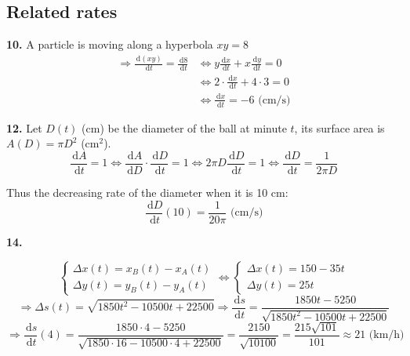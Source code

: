 \documentclass[a4paper,12pt]{article}
\newcommand{\ud}{\,\mathrm{d}}
\begin{document}
\subsection{Related rates}
\textbf{10. }A particle is moving along a hyperbola $xy = 8$
\begin{align*}
  \Longrightarrow \frac{\ud (xy)}{\ud t} = \frac{\ud 8}{\ud t}
  &\iff y\frac{\ud x}{\ud t} + x\frac{\ud y}{\ud t} = 0\\
  &\iff 2 \cdot \frac{\ud x}{\ud t} + 4 \cdot 3 = 0\\
  &\iff \frac{\ud x}{\ud t} = -6\text{ (cm/s)}
\end{align*}

\noindent\textbf{12. }Let $D(t)$ (cm) be the diameter of the ball at minute
$t$, its surface area is $A(D) = \pi D^2$ (cm$^2$).
\[\frac{\ud A}{\ud t} = 1 \iff \frac{\ud A}{\ud D} \cdot \frac{\ud D}{\ud t} = 1
  \iff 2\pi D \frac{\ud D}{\ud t} = 1 \iff \frac{\ud D}{\ud t}
                                  = \frac{1}{2\pi D}\]

Thus the decreasing rate of the diameter when it is 10 cm:
\[\frac{\ud D}{\ud t}(10) = \frac{1}{20\pi}\text{ (cm/s)}\]

\noindent\textbf{14. }

\[\begin{cases}
    \Delta x(t) = x_B(t) - x_A(t)\\
    \Delta y(t) = y_B(t) - y_A(t)
  \end{cases}
\iff\begin{cases}
      \Delta x(t) = 150 - 35t\\
      \Delta y(t) = 25t
  \end{cases}\]
\[\Longrightarrow\Delta s(t) = \sqrt{1850t^2 - 10500t + 22500}
  \Longrightarrow\frac{\ud s}{\ud t} = \frac{1850t - 5250}
                                       {\sqrt{1850t^2 - 10500t + 22500}}\]
\[\Longrightarrow\frac{\ud s}{\ud t}(4)
               = \frac{1850\cdot4 - 5250}
                      {\sqrt{1850\cdot16 - 10500\cdot4 + 22500}}
               = \frac{2150}{\sqrt{10100}}
               = \frac{215\sqrt{101}}{101}
               \approx 21\text{ (km/h)}\]
\end{document}
